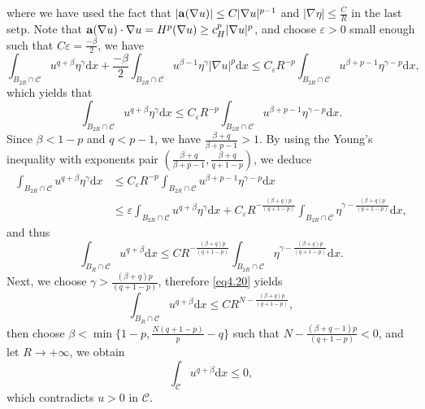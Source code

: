 \documentclass[12pt]{amsart}
\theoremstyle{definition}
\theoremstyle{remark}
\theoremstyle{conclusion}
\theoremstyle{conjecture}
\numberwithin{equation}{section}
\begin{document}
where we have used the fact that $|{\bf{a}}(\nabla u)|\leq C|\nabla u|^{p-1}$ and $|\nabla \eta|\leq \frac{C}{R}$ in the last setp. Note that ${\bf{a}}(\nabla u)\cdot\nabla u=H^p(\nabla u)\geq c_{H}^p|\nabla u|^p$, and choose $\varepsilon>0$ small enough such that
$C\varepsilon=\frac{-\beta}{2}$, we have
$$\int_{B_{2R}\cap\mathcal{C}}u^{q+\beta}\eta^{\gamma}\mathrm{d}x+\frac{-\beta}{2}\int_{B_{2R}\cap\mathcal{C}}u^{\beta-1}\eta^{\gamma}|\nabla u|^{p}\mathrm{d}x\leq C_{\varepsilon}R^{-p}\int_{B_{2R}\cap\mathcal{C}}u^{\beta+p-1}\eta^{\gamma-p}\mathrm{d}x,$$
which yields that
$$\int_{B_{2R}\cap\mathcal{C}}u^{q+\beta}\eta^{\gamma}\mathrm{d}x\leq C_{\varepsilon}R^{-p}\int_{B_{2R}\cap\mathcal{C}}u^{\beta+p-1}\eta^{\gamma-p}\mathrm{d}x.$$
Since $\beta<1-p$ and $q<p-1$, we have $\frac{\beta+q}{\beta+p-1}>1$. By using the Young's inequality with exponents pair $(\frac{\beta+q}{\beta+p-1}, \frac{\beta+q}{q+1-p})$, we deduce
\begin{equation*}
 \begin{aligned}
  \int_{B_{2R}\cap\mathcal{C}}u^{q+\beta}\eta^{\gamma}\mathrm{d}x
  &\leq C_{\varepsilon}R^{-p}\int_{B_{2R}\cap\mathcal{C}}u^{\beta+p-1}\eta^{\gamma-p}\mathrm{d}x\\
  &\leq \varepsilon \int_{B_{2R}\cap\mathcal{C}}u^{q+\beta}\eta^{\gamma}\mathrm{d}x+C_{\varepsilon}R^{-\frac{(\beta+q)p}{(q+1-p)}}\int_{B_{2R}\cap\mathcal{C}}\eta^{\gamma-\frac{(\beta+q)p}{(q+1-p)}}\mathrm{d}x,
 \end{aligned}
\end{equation*}
and thus
\begin{equation}\label{eq4.20}
    \int_{B_{R}\cap\mathcal{C}}u^{q+\beta}\mathrm{d}x\leq CR^{-\frac{(\beta+q)p}{(q+1-p)}}\int_{B_{2R}\cap\mathcal{C}}\eta^{\gamma-\frac{(\beta+q)p}{(q+1-p)}}\mathrm{d}x.
\end{equation}
Next, we choose $\gamma>\frac{(\beta+q)p}{(q+1-p)}$, therefore \eqref{eq4.20} yields
$$\int_{B_{R}\cap\mathcal{C}}u^{q+\beta}\mathrm{d}x\leq CR^{N-\frac{(\beta+q)p}{(q+1-p)}},$$
then choose $\beta<\min\{1-p,\frac{N(q+1-p)}{p}-q\}$ such that $N-\frac{(\beta+q-1)p}{(q+1-p)}<0$, and let $R\rightarrow+\infty$, we obtain
$$\int_{\mathcal{C}}u^{q+\beta}\mathrm{d}x\leq0,$$
which contradicts $u>0$ in $\mathcal{C}$.

\smallskip
\end{document}
